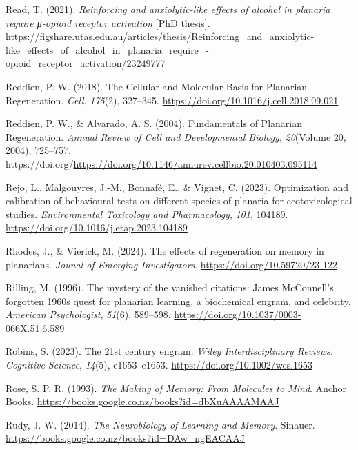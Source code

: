 \documentclass[
  jou,
  floatsintext,
  longtable,
  nolmodern,
  notxfonts,
  notimes,
  donotrepeattitle,
  colorlinks=true,linkcolor=blue,citecolor=blue,urlcolor=blue]{apa7}
\newlength{\cslhangindent}
\newenvironment{CSLReferences}[2] %
 {\begin{list}{}{%
  \setlength{\itemindent}{0pt}
  \setlength{\leftmargin}{0pt}
  \setlength{\parsep}{0pt}
  \ifodd #1
   \setlength{\leftmargin}{\cslhangindent}
   \setlength{\itemindent}{-1\cslhangindent}
  \fi
  \setlength{\itemsep}{#2\baselineskip}}}
 {\end{list}}
\begin{document}
\begin{CSLReferences}{1}{0}
Read, T. (2021). \emph{Reinforcing and anxiolytic-like effects of
alcohol in planaria require μ-opioid receptor activation} {[}PhD
thesis{]}.
\url{https://figshare.utas.edu.au/articles/thesis/Reinforcing_and_anxiolytic-like_effects_of_alcohol_in_planaria_require_-opioid_receptor_activation/23249777}

Reddien, P. W. (2018). The {Cellular} and {Molecular} {Basis} for
{Planarian} {Regeneration}. \emph{Cell}, \emph{175}(2), 327--345.
\url{https://doi.org/10.1016/j.cell.2018.09.021}

Reddien, P. W., \& Alvarado, A. S. (2004). Fundamentals of {Planarian}
{Regeneration}. \emph{Annual Review of Cell and Developmental Biology},
\emph{20}(Volume 20, 2004), 725--757.
https://doi.org/\url{https://doi.org/10.1146/annurev.cellbio.20.010403.095114}

Rejo, L., Malgouyres, J.-M., Bonnafé, E., \& Vignet, C. (2023).
Optimization and calibration of behavioural tests on different species
of planaria for ecotoxicological studies. \emph{Environmental Toxicology
and Pharmacology}, \emph{101}, 104189.
\url{https://doi.org/10.1016/j.etap.2023.104189}

Rhodes, J., \& Vierick, M. (2024). The effects of regeneration on memory
in planarians. \emph{Jounal of Emerging Investigators}.
\url{https://doi.org/10.59720/23-122}

Rilling, M. (1996). The mystery of the vanished citations: {James}
{McConnell}'s forgotten 1960s quest for planarian learning, a
biochemical engram, and celebrity. \emph{American Psychologist},
\emph{51}(6), 589--598. \url{https://doi.org/10.1037/0003-066X.51.6.589}

Robins, S. (2023). The 21st century engram. \emph{Wiley
Interdisciplinary Reviews. Cognitive Science}, \emph{14}(5),
e1653--e1653. \url{https://doi.org/10.1002/wcs.1653}

Rose, S. P. R. (1993). \emph{The {Making} of {Memory}: {From}
{Molecules} to {Mind}}. Anchor Books.
\url{https://books.google.co.nz/books?id=dbXuAAAAMAAJ}

Rudy, J. W. (2014). \emph{The {Neurobiology} of {Learning} and
{Memory}}. Sinauer.
\url{https://books.google.co.nz/books?id=DAw_ngEACAAJ}


\end{CSLReferences}
\end{document}
